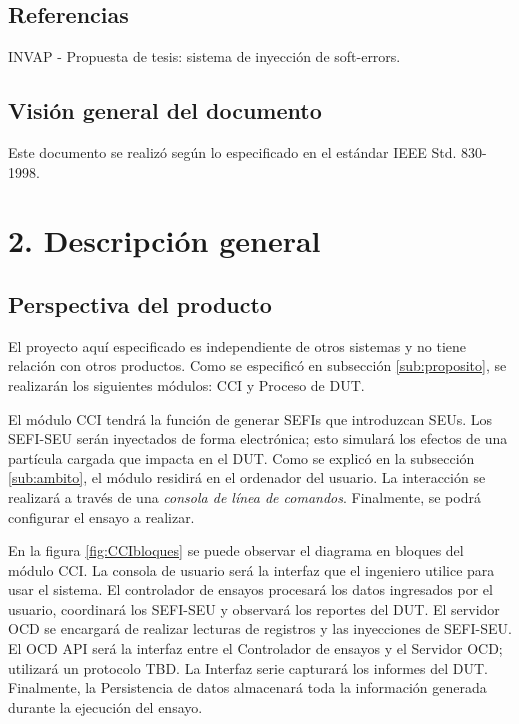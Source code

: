 \documentclass[
11pt, %
codirector, %
]{charter}
\begin{document}
\subsection{Referencias}
\label{sub:referencias}
INVAP - Propuesta de tesis: sistema de inyección de soft-errors.

\subsection{Visión general del documento}
\label{sub:vision}

Este documento se realizó según lo especificado en el estándar IEEE Std. 830-1998.

\section{2. Descripción general}
\label{seb:descripcion}

\subsection{Perspectiva del producto}
\label{sub:perspectiva}

El proyecto aquí especificado es independiente de otros sistemas y no tiene relación con otros productos.
Como se especificó en subsección \ref{sub:proposito}, se realizarán los siguientes módulos: CCI y Proceso de DUT.

El módulo CCI tendrá la función de generar SEFIs que introduzcan SEUs.
Los SEFI-SEU serán inyectados de forma electrónica; esto simulará los efectos de una partícula cargada que impacta en el DUT.
Como se explicó en la subsección \ref{sub:ambito}, el módulo residirá en el ordenador del usuario.
La interacción se realizará a través de una \emph{consola de línea de comandos}.
Finalmente, se podrá configurar el ensayo a realizar.

En la figura \ref{fig:CCIbloques} se puede observar el diagrama en bloques del módulo CCI.
La consola de usuario será la interfaz que el ingeniero utilice para usar el sistema.
El controlador de ensayos procesará los datos ingresados por el usuario, coordinará los SEFI-SEU y observará los reportes del DUT.
El servidor OCD se encargará de realizar lecturas de registros y las inyecciones de SEFI-SEU.
El OCD API será la interfaz entre el Controlador de ensayos y el Servidor OCD; utilizará un protocolo TBD.
La Interfaz serie capturará los informes del DUT.
Finalmente, la Persistencia de datos almacenará toda la información generada durante la ejecución del ensayo.
\end{document}
